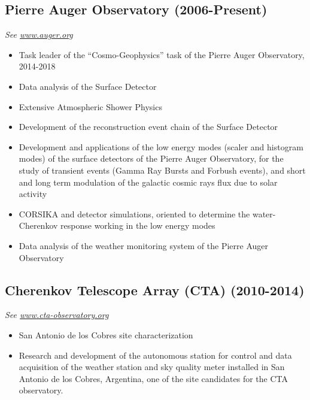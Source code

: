 \subsection*{Pierre Auger Observatory (2006-Present)}
{\small{\textit{See \href{http://www.auger.org/}{www.auger.org}}}}
\begin{itemize}
\item Task leader of the ``Cosmo-Geophysics'' task of the Pierre Auger Observatory, 2014-2018
\item Data analysis of the Surface Detector
\item Extensive Atmospheric Shower Physics
\item Development of the reconstruction event chain of the Surface Detector
\item Development and applications of the low energy modes (scaler and histogram
modes) of the surface detectors of the Pierre Auger Observatory, for the study
of transient events (Gamma Ray Bursts and Forbush events), and short and long
term modulation of the galactic cosmic rays flux due to solar activity
\item CORSIKA and detector simulations, oriented to determine the
water-Cherenkov response working in the low energy modes
\item Data analysis of the weather monitoring system of the Pierre Auger
Observatory
\end{itemize}
\subsection*{Cherenkov Telescope Array (CTA) (2010-2014)}
{\small{\textit{See \href{http://www.cta-observatory.org}{www.cta-observatory.org}}}}
\begin{itemize}
\item San Antonio de los Cobres site characterization
\item Research and development of the autonomous station for control and data
acquisition of the weather station and sky quality meter installed in San
Antonio de los Cobres, Argentina, one of the site candidates for the CTA
observatory.
\end{itemize}
\fi

